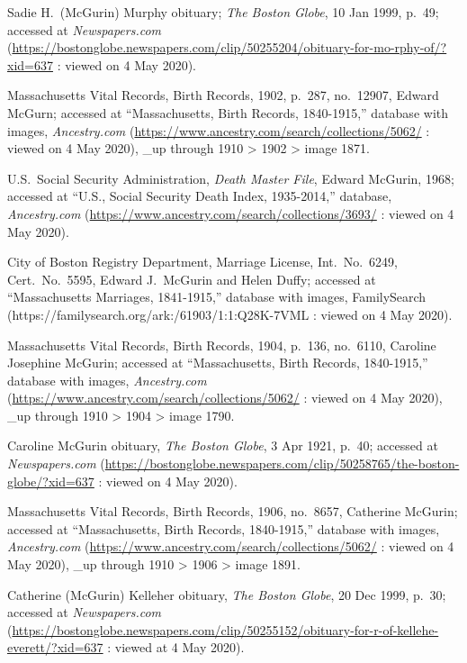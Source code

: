 \begin{thebibliography}{999}
	Sadie H.\ (McGurin) Murphy obituary; \textit{The Boston Globe}, 10 Jan 1999, p.\ 49; accessed at \textit{Newspapers.com} (\url{https://bostonglobe.newspapers.com/clip/50255204/obituary-for-mo-rphy-of/?xid=637} : viewed on 4 May 2020).
	
	Massachusetts Vital Records, Birth Records, 1902, p.\ 287, no.\ 12907, Edward McGurn; accessed at ``Massachusetts, Birth Records, 1840-1915,'' database with images, \textit{Ancestry.com} (\url{https://www.ancestry.com/search/collections/5062/} : viewed on 4 May 2020), \_up through 1910 > 1902 > image 1871.
	
	U.S.\ Social Security Administration, \textit{Death Master File}, Edward McGurin, 1968; accessed at ``U.S., Social Security Death Index, 1935-2014,'' database, \textit{Ancestry.com} (\url{https://www.ancestry.com/search/collections/3693/} : viewed on 4 May 2020).
	
	City of Boston Registry Department, Marriage License, Int.\ No.\ 6249, Cert.\ No.\ 5595, Edward J.\ McGurin and Helen Duffy; accessed at ``Massachusetts Marriages, 1841-1915,'' database with images, FamilySearch (https://familysearch.org/ark:/61903/1:1:Q28K-7VML : viewed on 4 May 2020).
	
	Massachusetts Vital Records, Birth Records, 1904, p.\ 136, no.\ 6110, Caroline Josephine McGurin; accessed at ``Massachusetts, Birth Records, 1840-1915,'' database with images, \textit{Ancestry.com} (\url{https://www.ancestry.com/search/collections/5062/} : viewed on 4 May 2020), \_up through 1910 > 1904 > image 1790.	
	
	Caroline McGurin obituary, \textit{The Boston Globe}, 3 Apr 1921, p.\ 40; accessed at \textit{Newspapers.com} (\url{https://bostonglobe.newspapers.com/clip/50258765/the-boston-globe/?xid=637} : viewed on 4 May 2020).
	
	Massachusetts Vital Records, Birth Records, 1906, no.\ 8657, Catherine McGurin; accessed at ``Massachusetts, Birth Records, 1840-1915,'' database with images, \textit{Ancestry.com} (\url{https://www.ancestry.com/search/collections/5062/} : viewed on 4 May 2020), \_up through 1910 > 1906 > image 1891.	
		
	Catherine (McGurin) Kelleher obituary, \textit{The Boston Globe}, 20 Dec 1999, p.\ 30; accessed at \textit{Newspapers.com} (\url{https://bostonglobe.newspapers.com/clip/50255152/obituary-for-r-of-kellehe-everett/?xid=637} : viewed at 4 May 2020).
	

\end{thebibliography}
